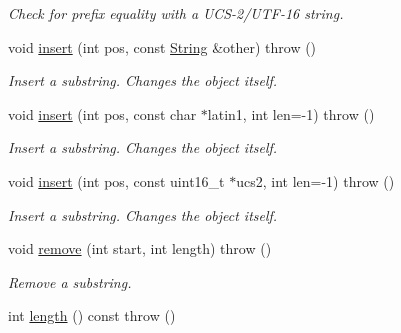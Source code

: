 \begin{CompactItemize}
\begin{CompactList}\small\item\em Check for prefix equality with a UCS-2/UTF-16 string. \item\end{CompactList}\item 
\hypertarget{classpmath_1_1_string_c831d1cb38364db06f862554fd8ab937}{
void \hyperlink{classpmath_1_1_string_c831d1cb38364db06f862554fd8ab937}{insert} (int pos, const \hyperlink{classpmath_1_1_string}{String} \&other)  throw ()}
\label{classpmath_1_1_string_c831d1cb38364db06f862554fd8ab937}

\begin{CompactList}\small\item\em Insert a substring. Changes the object itself. \item\end{CompactList}\item 
\hypertarget{classpmath_1_1_string_2fee8e495e29d9e3692505c683e59034}{
void \hyperlink{classpmath_1_1_string_2fee8e495e29d9e3692505c683e59034}{insert} (int pos, const char $\ast$latin1, int len=-1)  throw ()}
\label{classpmath_1_1_string_2fee8e495e29d9e3692505c683e59034}

\begin{CompactList}\small\item\em Insert a substring. Changes the object itself. \item\end{CompactList}\item 
\hypertarget{classpmath_1_1_string_9c28a74704e1e45bc9f81a99aab5aa10}{
void \hyperlink{classpmath_1_1_string_9c28a74704e1e45bc9f81a99aab5aa10}{insert} (int pos, const uint16\_\-t $\ast$ucs2, int len=-1)  throw ()}
\label{classpmath_1_1_string_9c28a74704e1e45bc9f81a99aab5aa10}

\begin{CompactList}\small\item\em Insert a substring. Changes the object itself. \item\end{CompactList}\item 
\hypertarget{classpmath_1_1_string_de3abf91ff746cf85bd211cc6156d5ac}{
void \hyperlink{classpmath_1_1_string_de3abf91ff746cf85bd211cc6156d5ac}{remove} (int start, int length)  throw ()}
\label{classpmath_1_1_string_de3abf91ff746cf85bd211cc6156d5ac}

\begin{CompactList}\small\item\em Remove a substring. \item\end{CompactList}\item 
\hypertarget{classpmath_1_1_string_a537e3415eb5dd0c546a54f82a3b8934}{
int \hyperlink{classpmath_1_1_string_a537e3415eb5dd0c546a54f82a3b8934}{length} () const   throw ()}
\label{classpmath_1_1_string_a537e3415eb5dd0c546a54f82a3b8934}


\end{CompactItemize}
